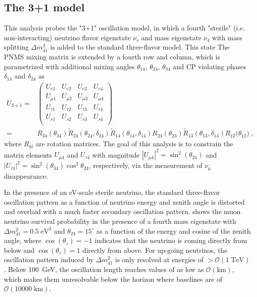 \subsection{The 3+1 model}
This analysis probes the "3+1" oscillation model, in which a fourth "sterile" (i.e. non-interacting) neutrino flavor eigenstate $\nu_s$ and mass eigenstate $\nu_4$ with mass splitting $\Delta m^2_{41}$ is added to the standard three-flavor model. This state The PNMS mixing matrix is extended by a fourth row and column, which is parametrized with additional mixing angles $\theta_{14}$, $\theta_{24}$, $\theta_{34}$ and CP violating phases $\delta_{14}$ and $\delta_{24}$ as
\begin{align*}
    U_{3+1} =&\begin{pmatrix}
    U_{e1}    & U_{e2}    & U_{e3}   &U_{e4}    \\
    U_{\mu1}  & U_{\mu2}  & U_{\mu3} &U_{\mu4}  \\
    U_{\tau1} & U_{\tau2} & U_{\tau3}&U_{\tau4} \\
    U_{s1} & U_{s2} & U_{s3}&U_{s4} \\
    \end{pmatrix}\\
    =&
    R_{34}(\theta_{34})
    \tilde{R}_{24}(\theta_{24}, \delta_{24})
    \tilde{R}_{14}(\theta_{14}, \delta_{14})
    R_{23}(\theta_{23})
    \tilde{R}_{13}(\theta_{13}, \delta_{13})
    R_{12}({\theta_{12})}\;,
\end{align*}
where $R_{kl}$ are rotation matrices. The goal of this analysis is to constrain the matrix elements $U_{\mu4}$ and $U_{\tau4}$ with magnitude $|U_{\mu4}|^2=\sin^2(\theta_{24})$ and  $|U_{\tau4}|^2=\sin^2(\theta_{34})\cos^2\theta_{24}$, respectively, via the measurement of $\nu_\mu$ disappearance.

In the presence of an eV-scale sterile neutrino, the standard three-flavor oscillation pattern as a function of neutrino energy and zenith angle is distorted and overlaid with a much faster secondary oscillation pattern.  shows the muon neutrino survival probability in the presence of a fourth mass eigenstate with $\Delta m^2_{41}=0.5\;\mathrm{eV^2}$ and $\theta_{24}=15^\circ$ as a function of the energy and cosine of the zenith angle, where $\cos(\theta_z)=-1$ indicates that the neutrino is coming directly from below and $\cos(\theta_z)=1$ directly from above. For up-going neutrinos, the oscillation pattern induced by $\Delta m^2_{41}$ is only resolved at energies of $>\mathcal{O}(1\;\mathrm{TeV})$. Below 100~GeV, the oscillation length reaches values of as low as $\mathcal{O}(\mathrm{km})$, which makes them unresolvable below the horizon where baselines are of $\mathcal{O}(10000\;\mathrm{km})$.

